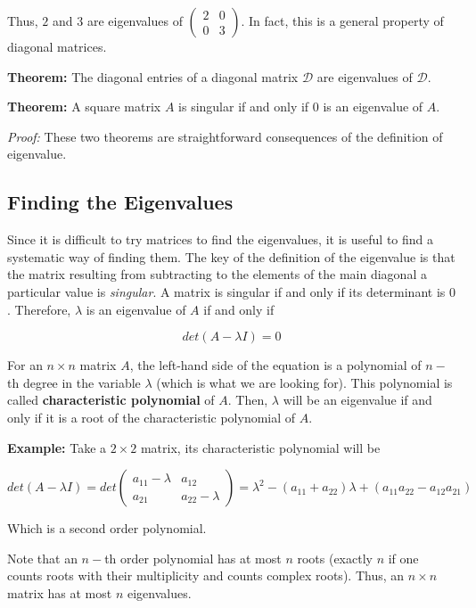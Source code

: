 \documentclass[11pt]{article}
\begin{document}
Thus, \(2\) and \(3\) are eigenvalues of
\(\begin{pmatrix} 2 & 0 \\ 0 & 3 \end{pmatrix}\). In fact, this is a
general property of diagonal matrices.

\textbf{Theorem:} The diagonal entries of a diagonal matrix
\(\mathcal{D}\) are eigenvalues of \(\mathcal{D}\).

\textbf{Theorem:} A square matrix \(A\) is singular if and only if \(0\)
is an eigenvalue of \(A\).

\emph{Proof:} These two theorems are straightforward consequences of the
definition of eigenvalue.

\hypertarget{finding-the-eigenvalues}{%
\subsection{Finding the Eigenvalues}\label{finding-the-eigenvalues}}

Since it is difficult to try matrices to find the eigenvalues, it is
useful to find a systematic way of finding them. The key of the
definition of the eigenvalue is that the matrix resulting from
subtracting to the elements of the main diagonal a particular value is
\emph{singular}. A matrix is singular if and only if its determinant is
\(0\). Therefore, \(\lambda\) is an eigenvalue of \(A\) if and only if

\[
det(A-\lambda I) = 0
\]

For an \(n\times n\) matrix \(A\), the left-hand side of the equation is
a polynomial of \(n-\)th degree in the variable \(\lambda\) (which is
what we are looking for). This polynomial is called
\textbf{characteristic polynomial} of \(A\). Then, \(\lambda\) will be
an eigenvalue if and only if it is a root of the characteristic
polynomial of \(A\).

\textbf{Example:} Take a \(2\times 2\) matrix, its characteristic
polynomial will be

\[
det(A-\lambda I)  = det\begin{pmatrix} a_{11}-\lambda & a_{12} \\ a_{21} & a_{22}-\lambda \end{pmatrix} = \lambda^2 - (a_{11}+a_{22})\lambda + (a_{11}a_{22}-a_{12}a_{21})
\]

Which is a second order polynomial.

Note that an \(n-\)th order polynomial has at most \(n\) roots (exactly
\(n\) if one counts roots with their multiplicity and counts complex
roots). Thus, an \(n\times n\) matrix has at most \(n\) eigenvalues.
\end{document}
